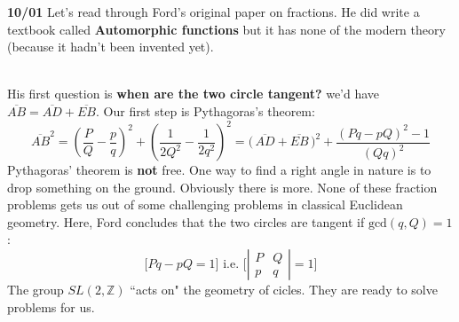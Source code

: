 \documentclass[12pt]{article}
\begin{document}
\noindent \textbf{10/01} Let's read through Ford's original paper on fractions. He did write a textbook called \textbf{Automorphic functions} but it has none of the modern theory (because it hadn't been invented yet). \\
 \\
His first question is \textbf{when are the two circle tangent?}  we'd have $\overline{AB} = \overline{AD} + \overline{EB} $.  Our first step is Pythagoras's theorem:
$$ \overline{AB}^2 = \left( \frac{P}{Q} - \frac{p}{q} \right)^2
+ \left( \frac{1}{2Q^2}  - \frac{1}{2q^2}\right)^2 
 = \big(\,\overline{AD} + \overline{EB}\,\big)^2 + \frac{(Pq - pQ)^2-1}{(Qq)^2} $$
Pythagoras' theorem is \textbf{not} free.  One way to find a right angle in nature is to drop something on the ground.  Obviously there is more.  None of these fraction problems gets us out of some challenging problems in classical Euclidean geometry.  Here, Ford concludes that the two circles are tangent if $ \text{gcd}(q,Q) = 1$:
$$ \Big[Pq - pQ = 1\Big]  \text{ i.e. } \Big[ \left|
\begin{array}{cc} P & Q \\ p & q \end{array} \right|  = 1 \Big] $$
The group $SL(2, \mathbb{Z})$ ``acts on" the geometry of cicles.  They are ready to solve problems for us.
\\
\end{document}
